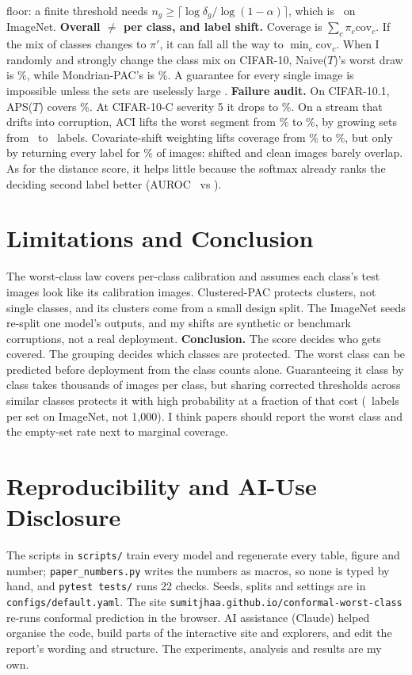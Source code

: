 \documentclass{article}
\begin{document}
floor: a finite threshold needs $n_g\ge\lceil\log\delta_g/\log(1-\alpha)\rceil$, which is \PacMinINet\ on ImageNet.
\textbf{Overall $\ne$ per class, and label shift.} Coverage is $\sum_c\pi_c\mathrm{cov}_c$. If the mix of classes changes to $\pi'$, it can
fall all the way to $\min_c\mathrm{cov}_c$. When I randomly and strongly change the class mix on CIFAR-10, Naive($T$)'s worst draw is
\LsCTenNaiveMin\%, while Mondrian-PAC's is \LsCTenMondPACMin\%. A guarantee for every single image is impossible unless the sets are uselessly large
\citep{vovk2012conditional,barber2021limits}.
\textbf{Failure audit.} On CIFAR-10.1, APS($T$) covers \TenCTenAPST\%. At CIFAR-10-C severity 5 it drops to \CcCTenAPSTSFive\%. On a
stream that drifts into corruption, ACI lifts the worst segment from \AciCTenFixCov\% to \AciCTenAciCov\%, by growing sets from
\AciCTenFixSize\ to \AciCTenAciSize\ labels. Covariate-shift weighting lifts coverage from \WtCovStdCTen\% to \WtCovWCTen\%, but only
by returning every label for \WtInfCTen\% of images: shifted and clean images barely overlap. As for the distance score, it helps little
because the softmax already ranks the deciding second label better (AUROC \DdSoftCTen\ vs \DdDistCTen).

\section{Limitations and Conclusion}
The worst-class law covers per-class calibration and assumes each class's test images look like its calibration images.
Clustered-PAC protects clusters, not single classes, and its clusters come from a small design split. The ImageNet seeds re-split one
model's outputs, and my shifts are synthetic or benchmark corruptions, not a real deployment.
\textbf{Conclusion.} The score decides who gets covered. The grouping decides which classes are protected. The worst class can be
predicted before deployment from the class counts alone. Guaranteeing it class by class takes thousands of images per class, but
sharing corrected thresholds across similar classes protects it with high probability at a fraction of that cost (\SizeINetClusPAC\
labels per set on ImageNet, not 1{,}000). I think papers should report the worst class and the empty-set rate next to marginal coverage.

\section{Reproducibility and AI-Use Disclosure}
The scripts in \texttt{scripts/} train every model and regenerate every table, figure and number; \texttt{paper\_numbers.py} writes
the numbers as macros, so none is typed by hand, and \texttt{pytest tests/} runs 22 checks. Seeds, splits and settings are in
\texttt{configs/default.yaml}. The site \texttt{sumitjhaa.github.io/conformal-worst-class} re-runs conformal prediction in the browser.
AI assistance (Claude) helped organise the code, build parts of the interactive site and explorers, and edit the report's wording and
structure. The experiments, analysis and results are my own.

{\small\setlength{\bibsep}{0.8pt}

}
\end{document}
